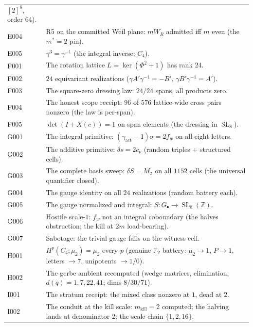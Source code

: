 \documentclass[11pt]{article}
\newcommand{\Z}{\mathbb Z}
\newcommand{\F}{\mathbb F}
\newcommand{\SL}{\operatorname{SL}}
\begin{document}
\begin{longtable}{@{}p{1.1cm}p{13.5cm}@{}}
$[2]^6$, order $64$). \\
E004 & R5 on the committed Weil plane: $m W_R$ admitted iff $m$ even
(the $m^\ast=2$ pin). \\
E005 & $\gamma^3=\gamma^{-1}$ (the integral inverse; $C_4$). \\
F001 & The rotation lattice $L=\ker(\Phi^2+1)$ has rank $24$. \\
F002 & $24$ equivariant realizations
($\gamma A'\gamma^{-1}=-B'$, $\gamma B'\gamma^{-1}=A'$). \\
F003 & The square-zero dressing law: $24/24$ spans, all products
zero. \\
F004 & The honest scope receipt: $96$ of $576$ lattice-wide cross
pairs nonzero (the law is per-span). \\
F005 & $\det(I+X(c))=1$ on span elements (the dressing in
$\SL_8$). \\
G001 & The integral primitive:
$(\gamma_{\mathrm{act}}-1)\sigma=2f_w$ on all eight letters. \\
G002 & The additive primitive: $\delta s=2c_\nu$ (random triples +
structured cells). \\
G003 & The complete basis sweep: $\delta S=M_2$ on all $1152$ cells
(the universal quantifier closed). \\
G004 & The gauge identity on all $24$ realizations (random battery
each). \\
G005 & The gauge normalized and integral:
$S\colon G_\bullet\to\SL_8(\Z)$. \\
G006 & Hostile scale-$1$: $f_w$ not an integral coboundary (the
halves obstruction; the kill at $2m$ load-bearing). \\
G007 & Sabotage: the trivial gauge fails on the witness cell. \\
H001 & $H^p(C_4;\mu_2)=\mu_2$ every $p$ (genuine $\F_2$ battery:
$\mu_2\to1$, $P\to1$, letters $\to7$, unipotents $\to1/0$). \\
H002 & The gerbe ambient recomputed (wedge matrices, elimination,
$d(q)=1,7,22,41$; dims $8/30/71$). \\
I001 & The stratum receipt: the mixed class nonzero at $1$, dead at
$2$. \\
I002 & The conduit at the kill scale: $m_{\mathrm{kill}}=2$ computed;
the halving lands at denominator $2$; the scale chain
$\{1,2,16\}$. \\
\bottomrule
\end{longtable}
\end{document}
